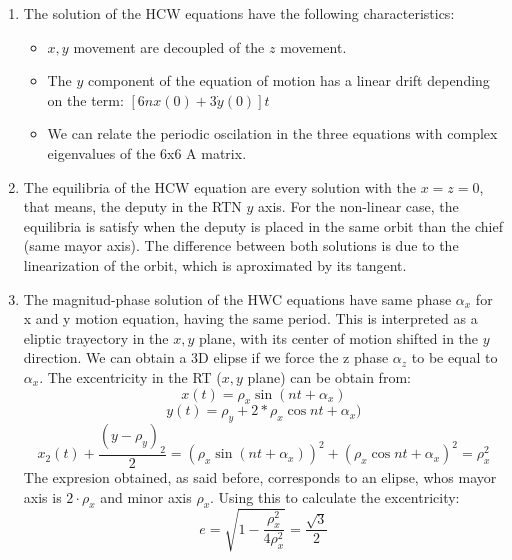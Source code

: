 \documentclass[a4paper]{article}
\begin{document}
\begin{enumerate}[label=\emph{\alph*)}]
  
  \item %
    The solution of the HCW equations have the following characteristics:
    \begin{itemize}
      \item $x,y$ movement are decoupled of the $z$ movement.
      \item The $y$ component of the equation of motion has a linear drift depending on the term: $[6nx(0)+3\dot{y}(0)]t$
      \item We can relate the periodic oscilation in the three equations with complex eigenvalues of the 6x6 A matrix.
    \end{itemize}
  \item %
    The equilibria of the HCW equation are every solution with the $x=z=0$, that means, the deputy in the RTN $y$ axis. For the non-linear case, the equilibria is satisfy when the deputy is placed in the same orbit than the chief (same mayor axis). The difference between both solutions is due to the linearization of the orbit, which is aproximated by its tangent.
  
  \item %
    The magnitud-phase solution of the HWC equations have same phase $\alpha_x$  for x and y motion equation, having the same period. This is interpreted as a eliptic trayectory in the $x,y$ plane, with its center of motion shifted in the $y$ direction. We can obtain a 3D elipse if we force the z phase $\alpha_z$ to be equal to $\alpha_x$. The excentricity in the RT ($x,y$ plane) can be obtain from:
    \[ x(t)=\rho_x\sin{(nt+\alpha_x)}\]
    \[y(t)=\rho_y+2*\rho_x\cos{nt+\alpha_x)}\]
    \[x_2(t)+\frac{{(y-\rho_y)}_2}{2}=(\rho_x\sin{(nt+\alpha_x)})^2+(\rho_x\cos{nt+\alpha_x})^2=\rho_x^2\]
  The expresion obtained, as said before, corresponds to an elipse, whos mayor axis is $2\cdot \rho_x$ and minor axis $\rho_x$. Using this to calculate the excentricity:
    \[e=\sqrt{1-\frac{\rho_x^2}{4\rho_x^2}}=\frac{\sqrt{3}}{2}\]


\end{enumerate}
\end{document}
